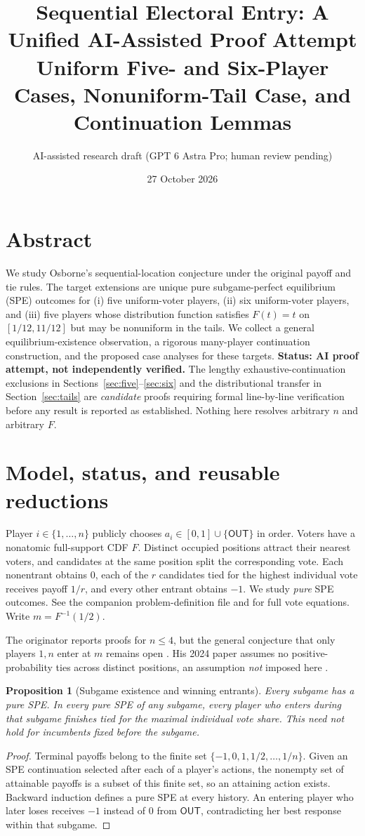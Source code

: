 \documentclass[10pt]{article}
\title{Sequential Electoral Entry: A Unified AI-Assisted Proof Attempt\\\large Uniform Five- and Six-Player Cases, Nonuniform-Tail Case, and Continuation Lemmas}
\author{AI-assisted research draft (GPT 6 Astra Pro; human review pending)}
\date{27 October 2026}
\newtheorem{proposition}{Proposition}
\newcommand{\OUT}{\mathsf{OUT}}
\begin{document}
\maketitle
\section*{Abstract}
We study Osborne's sequential-location conjecture under the original payoff and tie rules. The target extensions are unique pure subgame-perfect equilibrium (SPE) outcomes for (i) five uniform-voter players, (ii) six uniform-voter players, and (iii) five players whose distribution function satisfies $F(t)=t$ on $[1/12,11/12]$ but may be nonuniform in the tails. We collect a general equilibrium-existence observation, a rigorous many-player continuation construction, and the proposed case analyses for these targets. \textbf{Status: AI proof attempt, not independently verified.} The lengthy exhaustive-continuation exclusions in Sections~\ref{sec:five}--\ref{sec:six} and the distributional transfer in Section~\ref{sec:tails} are \emph{candidate} proofs requiring formal line-by-line verification before any result is reported as established. Nothing here resolves arbitrary $n$ and arbitrary $F$.


\section{Model, status, and reusable reductions}
Player $i\in\{1,\ldots,n\}$ publicly chooses $a_i\in[0,1]\cup\{\OUT\}$ in order. Voters have a nonatomic full-support CDF $F$. Distinct occupied positions attract their nearest voters, and candidates at the same position split the corresponding vote. Each nonentrant obtains $0$, each of the $r$ candidates tied for the highest individual vote receives payoff $1/r$, and every other entrant obtains $-1$. We study \emph{pure} SPE outcomes. See the companion problem-definition file and \cite{OsborneWeb} for full vote equations. Write $m=F^{-1}(1/2)$.

The originator reports proofs for $n\le4$, but the general conjecture that only players $1,n$ enter at $m$ remains open \cite{OsborneWeb}. His 2024 paper assumes no positive-probability ties across distinct positions, an assumption \emph{not} imposed here \cite{Osborne2024}.

\begin{proposition}[Subgame existence and winning entrants]\label{prop:exist}
Every subgame has a pure SPE. In every pure SPE of any subgame, every player who \emph{enters during that subgame} finishes tied for the maximal individual vote share. This need not hold for incumbents fixed before the subgame.
\end{proposition}
\begin{proof}
Terminal payoffs belong to the finite set $\{-1,0,1,1/2,\ldots,1/n\}$. Given an SPE continuation selected after each of a player's actions, the nonempty set of attainable payoffs is a subset of this finite set, so an attaining action exists. Backward induction defines a pure SPE at every history. An entering player who later loses receives $-1$ instead of $0$ from $\OUT$, contradicting her best response within that subgame.
\end{proof}
\end{document}
